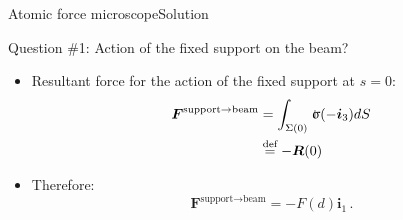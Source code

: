 \documentclass{beamer}
\newcommand{\id}{d}
\renewcommand{\ij}{i}
\newcommand{\iv}{{\boldsymbol\ij}}
\newcommand{\Fj}{F}
\newcommand{\Fv}{{\boldsymbol\Fj}}
\newcommand{\stress}{\mbox{$\hspace{0.3em}\rotatebox[x=0pt,y=0.2pt]{90}{\rule{0.017\linewidth}{0.4pt}}\hspace{-0.25em}\upsigma$}}
\newcommand{\Fresj}{R}
\newcommand{\Fres}{{\boldsymbol\Fresj}}
\begin{document}
\begin{frame}{Atomic force microscope}{Solution}
\begin{overprint}
\vskip-20pt
\begin{exampleblock}{Question \#1: Action of the fixed support on the beam?}
\begin{itemize}
\item Resultant force for the action of the fixed support at $s=0$:
\begin{displaymath}
\begin{split}
\Fv^\text{support$\to$beam} &=\int_{\Sigma(0)}\stress(-\iv_3) \id S \\
&\overset{\text{def}}{=}-\Fres(0)
\end{split}
\end{displaymath}
\item Therefore:
\begin{displaymath}
\Fv^\text{support$\to$beam} = -F(d)\iv_1\,.
\end{displaymath}
\end{itemize}
\end{exampleblock}

\end{overprint}

\end{frame}
\end{document}
